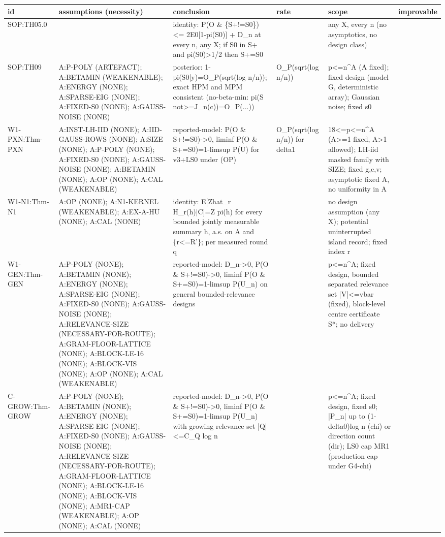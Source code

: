 \begin{longtable}{p{2.2cm}p{4.2cm}p{3cm}p{1.6cm}p{2.6cm}p{1.6cm}}
\textbf{id} & \textbf{assumptions (necessity)} & \textbf{conclusion} & \textbf{rate} & \textbf{scope} & \textbf{improvable} \\ \hline
\endhead
SOP:TH05.0 &  & identity: P(O \& \{S+!=S0\}) <= 2E0[1-pi(S0)] + D\_n at every n, any X; if S0 in S+ and pi(S0)>1/2 then S+=S0 &  & any X, every n (no asymptotics, no design class) &  \\
SOP:TH09 & A:P-POLY (ARTEFACT); A:BETAMIN (WEAKENABLE); A:ENERGY (NONE); A:SPARSE-EIG (NONE); A:FIXED-S0 (NONE); A:GAUSS-NOISE (NONE) & posterior: 1-pi(S0|y)=O\_P(sqrt(log n/n)); exact HPM and MPM consistent (no-beta-min: pi(S not>=J\_n(c))=O\_P(...)) & O\_P(sqrt(log n/n)) & p<=n\^{}A (A fixed); fixed design (model G, deterministic array); Gaussian noise; fixed s0 &  \\
W1-PXN:Thm-PXN & A:INST-LH-IID (NONE); A:IID-GAUSS-ROWS (NONE); A:SIZE (NONE); A:P-POLY (NONE); A:FIXED-S0 (NONE); A:GAUSS-NOISE (NONE); A:BETAMIN (NONE); A:OP (NONE); A:CAL (WEAKENABLE) & reported-model: P(O \& S+!=S0)->0, liminf P(O \& S+=S0)=1-limsup P(U) for v3+LS0 under (OP) & O\_P(sqrt(log n/n)) for delta1 & 18<=p<=n\^{}A (A>=1 fixed, A>1 allowed); LH-iid masked family with SIZE; fixed g,c,v; asymptotic fixed A, no uniformity in A &  \\
W1-N1:Thm-N1 & A:OP (NONE); A:N1-KERNEL (WEAKENABLE); A:EX-A-HU (NONE); A:CAL (NONE) & identity: E[Zhat\_r H\_r(h)|C]=Z pi(h) for every bounded jointly measurable summary h, a.s. on A and \{r<=R'\}; per measured round q &  & no design assumption (any X); potential uninterrupted island record; fixed index r &  \\
W1-GEN:Thm-GEN & A:P-POLY (NONE); A:BETAMIN (NONE); A:ENERGY (NONE); A:SPARSE-EIG (NONE); A:FIXED-S0 (NONE); A:GAUSS-NOISE (NONE); A:RELEVANCE-SIZE (NECESSARY-FOR-ROUTE); A:GRAM-FLOOR-LATTICE (NONE); A:BLOCK-LE-16 (NONE); A:BLOCK-VIS (NONE); A:OP (NONE); A:CAL (WEAKENABLE) & reported-model: D\_n->0, P(O \& S+!=S0)->0, liminf P(O \& S+=S0)=1-limsup P(U\_n) on general bounded-relevance designs &  & p<=n\^{}A; fixed design, bounded separated relevance set |V|<=vbar (fixed), block-level centre certificate S*; no delivery &  \\
C-GROW:Thm-GROW & A:P-POLY (NONE); A:BETAMIN (NONE); A:ENERGY (NONE); A:SPARSE-EIG (NONE); A:FIXED-S0 (NONE); A:GAUSS-NOISE (NONE); A:RELEVANCE-SIZE (NECESSARY-FOR-ROUTE); A:GRAM-FLOOR-LATTICE (NONE); A:BLOCK-LE-16 (NONE); A:BLOCK-VIS (NONE); A:MR1-CAP (WEAKENABLE); A:OP (NONE); A:CAL (NONE) & reported-model: D\_n->0, P(O \& S+!=S0)->0, liminf P(O \& S+=S0)=1-limsup P(U\_n) with growing relevance set |Q|<=C\_Q log n &  & p<=n\^{}A; fixed design, fixed s0; |P\_n| up to (1-delta0)log n (chi) or direction count (dir); LS0 cap MR1 (production cap under G4-chi) &  \\

\end{longtable}
